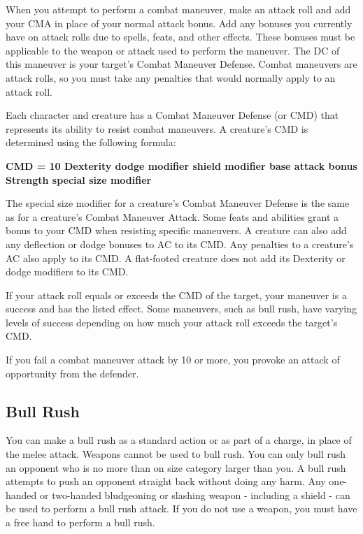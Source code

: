 When you attempt to perform a combat maneuver, make an attack roll and add your CMA in place of your normal attack bonus. Add any bonuses you currently have on attack rolls due to spells, feats, and other effects. These bonuses must be applicable to the weapon or attack used to perform the maneuver. The DC of this maneuver is your target's Combat Maneuver Defense. Combat maneuvers are attack rolls, so you must take any penalties that would normally apply to an attack roll.

 Each character and creature has a Combat Maneuver Defense (or CMD) that represents its ability to resist combat maneuvers. A creature's CMD is determined using the following formula:

\textbf{\centering CMD = 10 \add Dexterity \add dodge modifier \add shield modifier \add base attack bonus \add Strength \add special size modifier}

The special size modifier for a creature's Combat Maneuver Defense is the same as for a creature's Combat Maneuver Attack. Some feats and abilities grant a bonus to your CMD when resisting specific maneuvers. A creature can also add any deflection or dodge bonuses to AC to its CMD. Any penalties to a creature's AC also apply to its CMD. A flat-footed creature does not add its Dexterity or dodge modifiers to its CMD.

 If your attack roll equals or exceeds the CMD of the target, your maneuver is a success and has the listed effect. Some maneuvers, such as bull rush, have varying levels of success depending on how much your attack roll exceeds the target's CMD.

If you fail a combat maneuver attack by 10 or more, you provoke an attack of opportunity from the defender.

\subsection{Bull Rush}
You can make a bull rush as a standard action or as part of a charge, in place of the melee attack. Weapons cannot be used to bull rush. You can only bull rush an opponent who is no more than on size category larger than you. A bull rush attempts to push an opponent straight back without doing any harm. Any one-handed or two-handed bludgeoning or slashing weapon - including a shield - can be used to perform a bull rush attack. If you do not use a weapon, you must have a free hand to perform a bull rush.

